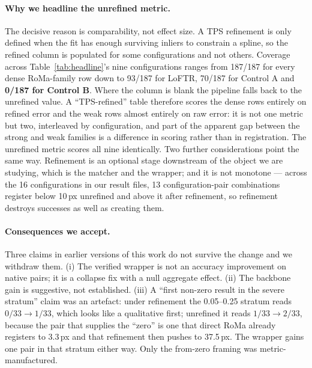 \documentclass[10pt]{article}
\begin{document}
\paragraph{Why we headline the unrefined metric.} The decisive reason is comparability, not effect size. A TPS refinement is only defined when the fit has enough surviving inliers to constrain a spline, so the refined column is populated for some configurations and not others. Coverage across Table~\ref{tab:headline}'s nine configurations ranges from 187/187 for every dense RoMa-family row down to 93/187 for LoFTR, 70/187 for Control A and \textbf{0/187 for Control B}. Where the column is blank the pipeline falls back to the unrefined value. A ``TPS-refined'' table therefore scores the dense rows entirely on refined error and the weak rows almost entirely on raw error: it is not one metric but two, interleaved by configuration, and part of the apparent gap between the strong and weak families is a difference in scoring rather than in registration. The unrefined metric scores all nine identically. Two further considerations point the same way. Refinement is an optional stage downstream of the object we are studying, which is the matcher and the wrapper; and it is not monotone --- across the 16 configurations in our result files, 13 configuration-pair combinations register below 10\,px unrefined and above it after refinement, so refinement destroys successes as well as creating them.

\paragraph{Consequences we accept.} Three claims in earlier versions of this work do not survive the change and we withdraw them. (i) The verified wrapper is not an accuracy improvement on native pairs; it is a collapse fix with a null aggregate effect. (ii) The backbone gain is suggestive, not established. (iii) A ``first non-zero result in the severe stratum'' claim was an artefact: under refinement the 0.05--0.25 stratum reads $0/33\rightarrow1/33$, which looks like a qualitative first; unrefined it reads $1/33\rightarrow2/33$, because the pair that supplies the ``zero'' is one that direct RoMa already registers to 3.3\,px and that refinement then pushes to 37.5\,px. The wrapper gains one pair in that stratum either way. Only the from-zero framing was metric-manufactured.
\end{document}
